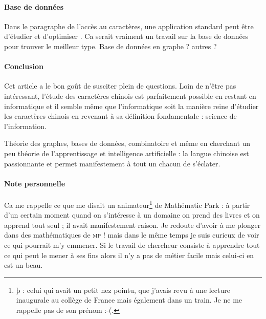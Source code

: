 \paragraph{Base de données} Dans le paragraphe de l'accès au caractères, une application standard peut être d'étudier et d'optimiser . Ca serait vraiment un travail sur la base de données pour trouver le meilleur type. Base de données en graphe ? autres ?

\paragraph{Conclusion} Cet article a le bon goût de susciter plein de questions. Loin de n'être pas intéressant, l'étude des caractères chinois est parfaitement possible en restant en informatique et il semble même que l'informatique soit la manière reine d'étudier les caractères chinois en revenant à sa définition fondamentale : science de l'information.\par Théorie des graphes, bases de données, combinatoire et même en cherchant un peu théorie de l'apprentissage et intelligence artificielle : la langue chinoise est passionnante et permet manifestement à tout un chacun de s'éclater.

\paragraph{Note personnelle} Ca me rappelle ce que me disait un animateur\footnote{þ : celui qui avait un petit nez pointu, que j'avais revu à une lecture inaugurale au collège de France mais également dans un train. Je ne me rappelle pas de son prénom :-(.} de Mathématic Park : à partir d'un certain moment quand on s'intéresse à un domaine on prend des livres et on apprend tout seul ; il avait manifestement raison. Je redoute d'avoir à me plonger dans des mathématiques de \textsc{mp} ! mais dans le même temps je suis curieux de voir ce qui pourrait m'y emmener. Si le travail de chercheur consiste à apprendre tout ce qui peut le mener à ses fins alors il n'y a pas de métier facile mais celui-ci en est un beau.
